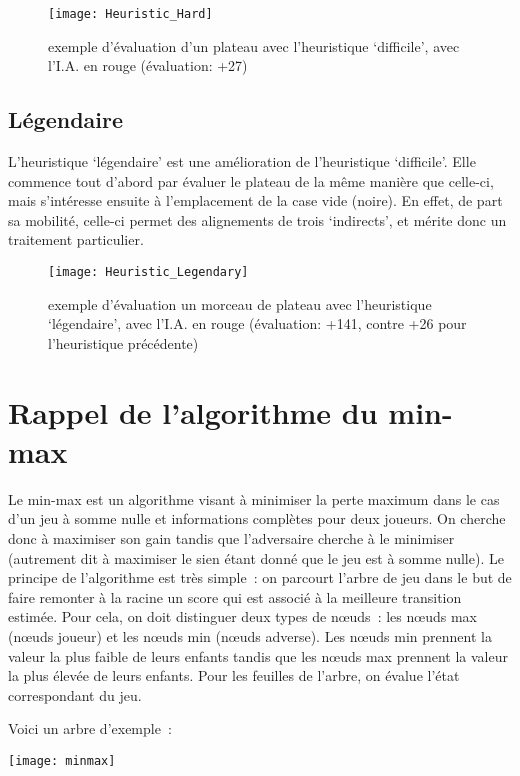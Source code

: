 \begin{figure}[H]
    \centering
    \texttt{[image: Heuristic\_Hard]}{}
    \caption{exemple d'évaluation d'un plateau avec l'heuristique `difficile', avec l'I.A. en rouge (évaluation: +27)}
\end{figure}


\subsection{Légendaire}

L'heuristique `légendaire' est une amélioration de l'heuristique `difficile'. Elle commence tout d'abord par évaluer
le plateau de la même manière que celle-ci, mais s'intéresse ensuite à l'emplacement de la case vide (noire). En effet,
de part sa mobilité, celle-ci permet des alignements de trois `indirects', et mérite donc un traitement particulier.

\begin{figure}[H]
    \centering
    \texttt{[image: Heuristic\_Legendary]}{}
    \caption{exemple d'évaluation un morceau de plateau avec l'heuristique `légendaire', avec l'I.A. en rouge (évaluation: +141, contre +26 pour l'heuristique précédente)}
\end{figure}

\section{Rappel de l'algorithme du min-max}

Le min-max est un algorithme visant à minimiser la perte maximum dans le cas d'un jeu à somme nulle
et informations complètes pour deux joueurs. On cherche donc à
maximiser son gain tandis que l'adversaire cherche à le minimiser (autrement dit à maximiser le
sien étant donné que le jeu est à somme nulle).
Le principe de l'algorithme est très simple : on parcourt l'arbre de jeu dans le but de faire remonter
à la racine un score qui est associé à la meilleure transition estimée.
Pour cela, on doit distinguer deux types de nœuds : les nœuds max (nœuds joueur) et les nœuds min (nœuds adverse).
Les nœuds min prennent la valeur la plus faible de leurs enfants tandis que les nœuds max prennent la valeur la
plus élevée de leurs enfants.
Pour les feuilles de l'arbre, on évalue l'état correspondant du jeu.

Voici un arbre d'exemple :

\texttt{[image: minmax]}

